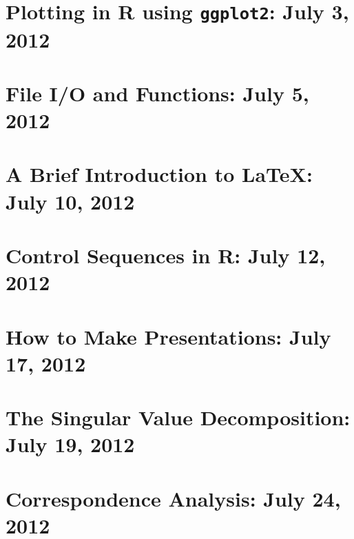 \documentclass[twosided,openany]{book}
\begin{document}
    \section{Plotting in R using \texttt{ggplot2}: July 3, 2012}
	
    \section{File I/O and Functions: July 5, 2012}
	
    \section{A Brief Introduction to \LaTeX{}: July 10, 2012}
	
    \section{Control Sequences in R: July 12, 2012}
	
    \section{How to Make Presentations: July 17, 2012}
	
    \section{The Singular Value Decomposition: July 19, 2012}
	\label{svd}
	
    \section{Correspondence Analysis: July 24, 2012}
	
\end{document}
